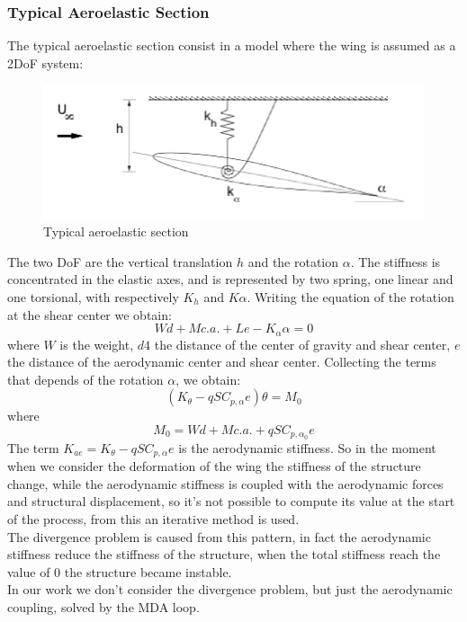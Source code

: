 \subsubsection{Typical Aeroelastic Section}
The typical aeroelastic section consist in a model where the wing is assumed as a 2DoF system:
\begin{figure}[H]
	\centering
	\includegraphics[width = 1\textwidth]{./Immagini/2_ala.png}
	\caption{Typical aeroelastic section}
	\label{fig:2_ala}
\end{figure}
The two DoF are the vertical translation $h$ and the rotation $\alpha$.
The stiffness is concentrated in the elastic axes, and is represented by two spring, one linear and one torsional, with respectively $K_h$ and $K{\alpha}$. Writing the equation of the rotation at the shear center we obtain:
\begin{equation*}
Wd+M{c.a.}+Le-K_{\alpha}\alpha=0
\end{equation*}
where $W$ is the weight, $d4$ the distance of the center of gravity and shear center, $e$ the distance of the aerodynamic center and shear center. Collecting the terms that depends of the rotation $\alpha$, we obtain:
\begin{equation*}
(K_{\theta}-qSC_{p,\alpha}e)\theta=M_0
\end{equation*}
where
\begin{equation*}
M_0=Wd+M{c.a.}+qSC_{p,{\alpha_0}}e
\end{equation*}
The term $K_{ae}=K_{\theta}-qSC_{p,\alpha}e$ is the aerodynamic stiffness. So in the moment when we consider the deformation of the wing the stiffness of the structure change, while the aerodynamic stiffness is coupled with the aerodynamic forces and structural displacement, so it's not possible to compute its value at the start of the process, from this an iterative method is used.\\
The divergence problem is caused from this pattern, in fact the aerodynamic stiffness reduce the stiffness of the structure, when the total stiffness reach the value of 0 the structure became instable.\\
In our work we don't consider the divergence problem, but just the aerodynamic coupling, solved by the MDA loop.